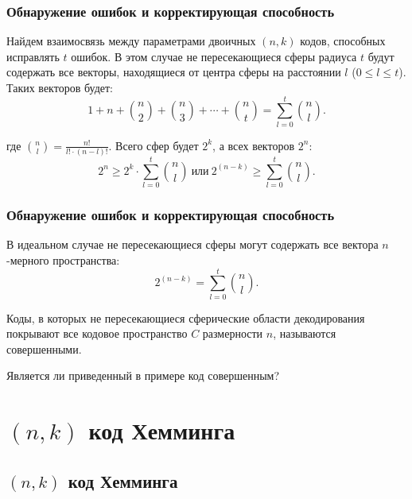 \begin{frame}
    \frametitle{Обнаружение ошибок и корректирующая способность}
    
    Найдем взаимосвязь между параметрами двоичных $(n, k)$ кодов, способных исправлять $t$ ошибок. В этом случае не пересекающиеся сферы радиуса $t$ будут содержать все векторы, находящиеся от центра сферы на расстоянии $l$ ($0\leq l\leq t$). Таких векторов будет:
    \[ 1+n+\binom{n}{2}+\binom{n}{3}+\cdots+\binom{n}{t}=\sum_{l=0}^{t}\binom{n}{l}. \]
    
    где $\binom{n}{l}=\frac{n!}{l!\cdot(n-l)!}$. Всего сфер будет $2^k$, а всех векторов $2^n$:
    \[
        2^n\geq 2^k\cdot\sum_{l=0}^{t}\binom{n}{l}
        \ \text{или}\ 
        2^{(n-k)}\geq\sum_{l=0}^{t}\binom{n}{l}.
    \]
\end{frame}


\begin{frame}
    \frametitle{Обнаружение ошибок и корректирующая способность}
    
    В идеальном случае не пересекающиеся сферы могут содержать все вектора $n$-мерного пространства:
    \[2^{(n-k)}=\sum_{l=0}^{t}\binom{n}{l}.\]
    
    \begin{definition}
        Коды, в которых не пересекающиеся сферические области декодирования покрывают все кодовое пространство $C$ размерности $n$, называются \alert{совершенными}.
    \end{definition}
    
    Является ли приведенный в примере код совершенным?
    \uncover<2->{\[2^{(7-4)}=\binom{7}{0}+\binom{7}{1}=8\]}
\end{frame}


\section{$(n,k)$ код Хемминга}


\subsection{$(n,k)$ код Хемминга}


